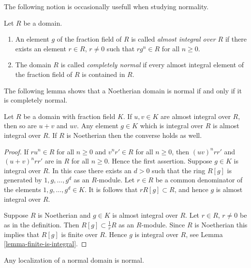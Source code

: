 \noindent
The following notion is occasionally usefull when
studying normality.

\begin{definition}
\label{definition-almost-integral}
Let $R$ be a domain.
\begin{enumerate}
\item An element $g$ of the fraction
field of $R$ is called {\it almost integral over $R$}
if there exists an element $r \in R$, $r\not = 0$
such that $rg^n \in R$ for all $n \geq 0$.
\item The domain $R$ is called {\it completely normal} if every
almost integral element of the fraction field of $R$ is
contained in $R$.
\end{enumerate}
\end{definition}

\noindent
The following lemma shows that a Noetherian domain is normal
if and only if it is completely normal.

\begin{lemma}
\label{lemma-almost-integral}
Let $R$ be a domain with fraction field $K$.
If $u, v \in K$ are almost integral over $R$, then so are
$u + v$ and $uv$. Any element $g \in K$ which is integral over $R$
is almost integral over $R$. If $R$ is Noetherian
then the converse holds as well.
\end{lemma}

\begin{proof}
If $ru^n \in R$ for all $n \geq 0$ and
$v^nr' \in R$ for all $n \geq 0$, then
$(uv)^nrr'$ and $(u + v)^nrr'$ are in $R$ for
all $n \geq 0$. Hence the first assertion.
Suppose $g \in K$ is integral over $R$.
In this case there exists an $d > 0$ such that
the ring $R[g]$ is generated by $1, g, \ldots, g^d$ as an $R$-module.
Let $r \in R$ be a common denominator of the elements
$1, g, \ldots, g^d \in K$. It is follows that $rR[g] \subset R$,
and hence $g$ is almost integral over $R$.

\medskip\noindent
Suppose $R$ is Noetherian and $g \in K$ is almost integral over $R$.
Let $r \in R$, $r\not= 0$ be as in the definition.
Then $R[g] \subset \frac{1}{r}R$ as an $R$-module.
Since $R$ is Noetherian this implies that $R[g]$ is
finite over $R$. Hence $g$ is integral over $R$, see
Lemma \ref{lemma-finite-is-integral}.
\end{proof}

\begin{lemma}
\label{lemma-localize-normal-domain}
Any localization of a normal domain is normal.
\end{lemma}

